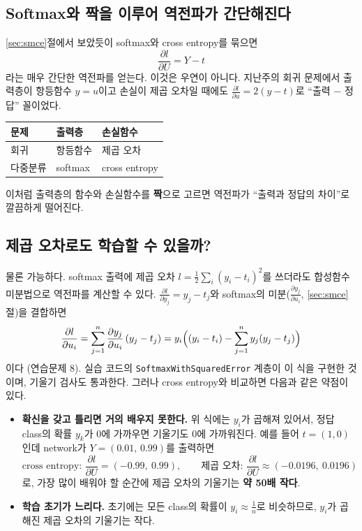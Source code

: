 \documentclass[11pt,a4paper]{article}
\newcommand{\pd}[2]{\frac{\partial #1}{\partial #2}}
\begin{document}
\subsection{Softmax와 짝을 이루어 역전파가 간단해진다}

\ref{sec:smce}절에서 보았듯이 softmax와 cross entropy를 묶으면
\[
\pd{l}{U}=Y-t
\]
라는 매우 간단한 역전파를 얻는다. 이것은 우연이 아니다.
지난주의 회귀 문제에서 출력층이 항등함수 $y=u$이고 손실이 제곱 오차일 때에도
$\pd{l}{u}=2(y-t)$로 ``출력 $-$ 정답'' 꼴이었다.
\begin{center}
\begin{tabular}{@{}lll@{}}
\toprule
문제 & 출력층 & 손실함수 \\
\midrule
회귀 & 항등함수 & 제곱 오차 \\
다중분류 & softmax & cross entropy \\
\bottomrule
\end{tabular}
\end{center}
이처럼 출력층의 함수와 손실함수를 \textbf{짝}으로 고르면
역전파가 ``출력과 정답의 차이''로 깔끔하게 떨어진다.

\subsection{제곱 오차로도 학습할 수 있을까?}

물론 가능하다. softmax 출력에 제곱 오차 $l=\frac12\sum_i(y_i-t_i)^2$를 쓰더라도
합성함수 미분법으로 역전파를 계산할 수 있다.
$\pd{l}{y_j}=y_j-t_j$와 softmax의 미분($\pd{y_j}{u_i}$, \ref{sec:smce}절)을 결합하면
\[
\pd{l}{u_i}
=\sum_{j=1}^{n}\pd{y_j}{u_i}\,(y_j-t_j)
=y_i\Bigl((y_i-t_i)-\sum_{j=1}^{n}y_j(y_j-t_j)\Bigr)
\]
이다 (연습문제 8). 실습 코드의 \texttt{SoftmaxWithSquaredError} 계층이 이 식을 구현한 것이며,
기울기 검사도 통과한다.
그러나 cross entropy와 비교하면 다음과 같은 약점이 있다.

\begin{itemize}[leftmargin=1.8em]
\item \textbf{확신을 갖고 틀리면 거의 배우지 못한다.}
위 식에는 $y_i$가 곱해져 있어서, 정답 class의 확률 $y_k$가 $0$에 가까우면 기울기도 $0$에 가까워진다.
예를 들어 $t=(1,0)$인데 network가 $Y=(0.01,\,0.99)$를 출력하면
\[
\text{cross entropy: }\pd{l}{U}=(-0.99,\ 0.99),
\qquad
\text{제곱 오차: }\pd{l}{U}\approx(-0.0196,\ 0.0196)
\]
로, 가장 많이 배워야 할 순간에 제곱 오차의 기울기는 \textbf{약 50배 작다}.
\item \textbf{학습 초기가 느리다.}
초기에는 모든 class의 확률이 $y_i\approx\frac1n$로 비슷하므로,
$y_i$가 곱해진 제곱 오차의 기울기는 작다.
\end{itemize}
\end{document}

